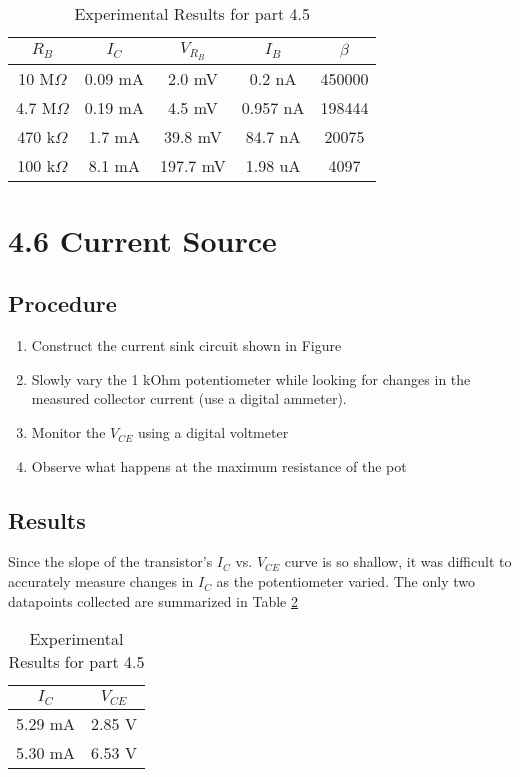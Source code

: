 \documentclass[12pt,letterpaper]{report}
\begin{document}
\begin{table}[ht]
\caption{Experimental Results for part 4.5} %
\centering 
    \begin{tabular}{| c | c | c | c | c |}
    \hline  
    $R_B$ & $I_C$ & $V_{R_B}$ & $I_B$ & $\beta$\\
    \hline
    10 M$\Omega$ & 0.09 mA & 2.0 mV   & 0.2 nA   & 450000 \\
    4.7 M$\Omega$ & 0.19 mA & 4.5 mV  & 0.957 nA & 198444 \\
    470 k$\Omega$ & 1.7 mA & 39.8 mV  & 84.7 nA  & 20075 \\
    100 k$\Omega$ & 8.1 mA & 197.7 mV & 1.98 uA  & 4097 \\
    \hline
    \end{tabular}
    \label{table:4-5_results}
\end{table}

\section*{4.6 Current Source}
\subsection*{Procedure}

\begin{enumerate}
\item Construct the current sink circuit shown in Figure %
\item Slowly vary the 1 kOhm potentiometer while looking for changes in the measured collector current (use a digital ammeter).
\item Monitor the $V_{CE}$ using a digital voltmeter
\item Observe what happens at the maximum resistance of the pot
\end{enumerate}

\subsection*{Results}
Since the slope of the transistor's $I_C$ vs. $V_{CE}$ curve is so shallow, it was difficult to accurately measure changes in $I_C$ as the potentiometer varied. The only two datapoints collected are summarized in Table \ref{table:4-6_results}

\begin{table}[ht]
\caption{Experimental Results for part 4.5} %
\centering 
    \begin{tabular}{| c | c |}
    \hline  
    $I_C$ & $V_{CE}$\\
    \hline
    5.29 mA & 2.85 V\\
    5.30 mA & 6.53 V\\
    \hline
    \end{tabular}
    \label{table:4-6_results}
\end{table}
\end{document}
